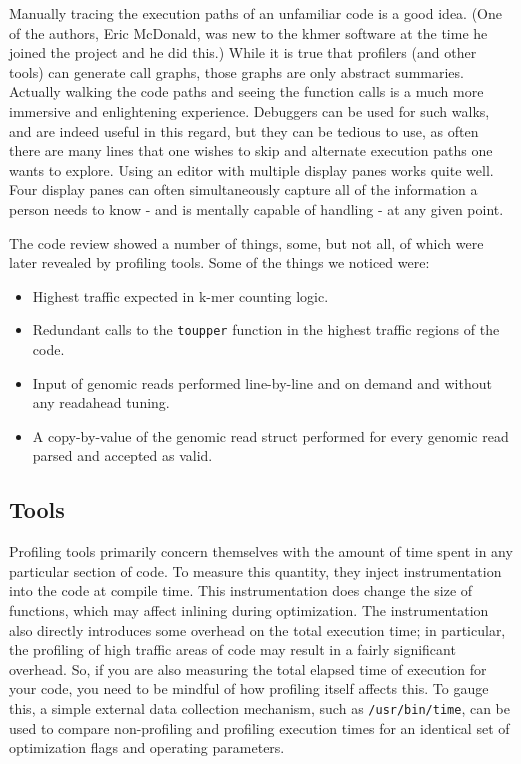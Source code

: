 \documentclass{article}
\begin{document}
Manually tracing the execution paths of an unfamiliar code is a good idea.
(One of the authors, Eric McDonald, was new to the khmer software at the time
he joined the project and he did this.) While it is true that profilers (and
other tools) can generate call graphs, those graphs are only abstract
summaries. Actually walking the code paths and seeing the function calls is a
much more immersive and enlightening experience. Debuggers can be used for such
walks, and are indeed useful in this regard, but they can be tedious to use, as
often there are many lines that one wishes to skip and alternate execution
paths one wants to explore. Using an editor with multiple display panes works
quite well. Four display panes can often simultaneously capture all of the
information a person needs to know - and is mentally capable of handling - at
any given point.

The code review showed a number of things, some, but not all, of which were
later revealed by profiling tools. Some of the things we noticed were:

\begin{itemize}
\item Highest traffic expected in k-mer counting logic.
\item Redundant calls to the \texttt{toupper} function in the highest traffic 
regions of the code.
\item Input of genomic reads performed line-by-line and on demand and without 
any readahead tuning.
\item A copy-by-value of the genomic read struct performed for every genomic 
read parsed and accepted as valid.
\end{itemize}

\subsection{Tools}

Profiling tools primarily concern themselves with the amount of time spent in
any particular section of code. To measure this quantity, they inject
instrumentation into the code at compile time. This instrumentation does change
the size of functions, which may affect inlining during optimization.  The
instrumentation also directly introduces some overhead on the total execution
time; in particular, the profiling of high traffic areas of code may result in
a fairly significant overhead. So, if you are also measuring the total elapsed
time of execution for your code, you need to be mindful of how profiling itself
affects this. To gauge this, a simple external data collection mechanism, such
as \texttt{/usr/bin/time}, can be used to compare non-profiling and profiling
execution times for an identical set of optimization flags and operating
parameters.
\end{document}
